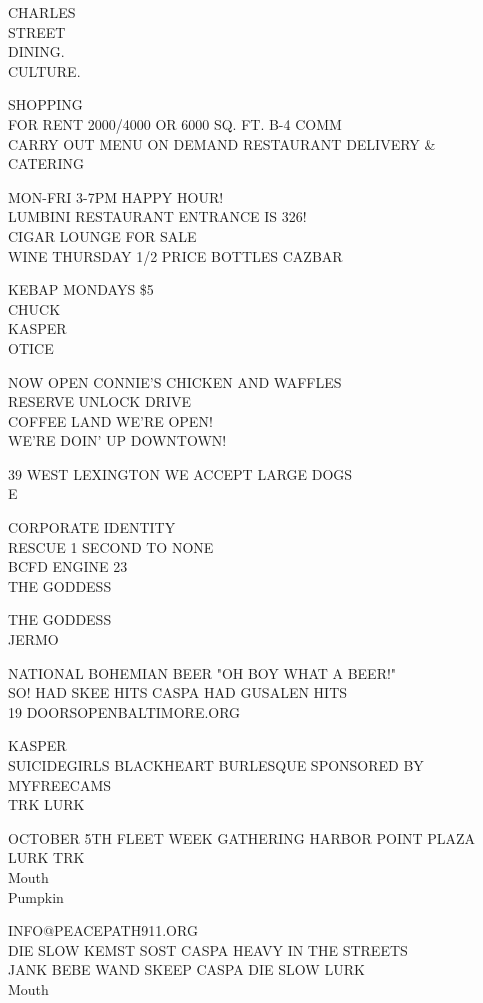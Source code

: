 \documentclass[10pt,letterpaper]{article}
\begin{document}
CHARLES\\
STREET\\
DINING.\\
CULTURE.

SHOPPING\\
FOR RENT 2000/4000 OR 6000 SQ. FT. B{-}4 COMM\\
CARRY OUT MENU ON DEMAND RESTAURANT DELIVERY \& CATERING

MON{-}FRI 3{-}7PM HAPPY HOUR!\\
LUMBINI RESTAURANT ENTRANCE IS 326!\\
CIGAR LOUNGE FOR SALE\\
WINE THURSDAY 1/2 PRICE BOTTLES CAZBAR

KEBAP MONDAYS \$5\\
CHUCK\\
KASPER\\
OTICE

NOW OPEN CONNIE'S CHICKEN AND WAFFLES\\
RESERVE UNLOCK DRIVE\\
COFFEE LAND WE'RE OPEN!\\
WE'RE DOIN' UP DOWNTOWN!

39 WEST LEXINGTON WE ACCEPT LARGE DOGS\\
E

CORPORATE IDENTITY\\
RESCUE 1 SECOND TO NONE\\
BCFD ENGINE 23\\
THE GODDESS

THE GODDESS\\
JERMO

NATIONAL BOHEMIAN BEER "OH BOY WHAT A BEER!"\\
SO!  HAD SKEE HITS CASPA HAD GUSALEN HITS\\
19 DOORSOPENBALTIMORE.ORG

KASPER\\
SUICIDEGIRLS BLACKHEART BURLESQUE SPONSORED BY MYFREECAMS\\
TRK LURK

OCTOBER 5TH FLEET WEEK GATHERING HARBOR POINT PLAZA\\
LURK TRK\\
Mouth\\
Pumpkin

INFO@PEACEPATH911.ORG\\
DIE SLOW KEMST SOST CASPA HEAVY IN THE STREETS\\
JANK BEBE WAND SKEEP CASPA DIE SLOW LURK\\
Mouth
\end{document}
